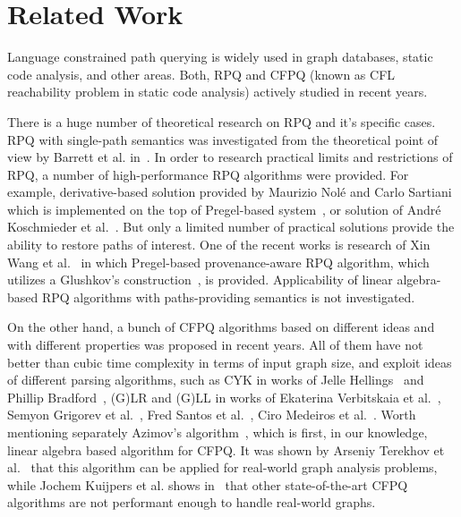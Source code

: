 \section{Related Work}

Language constrained path querying is widely used in graph databases, static code analysis, and other areas.
Both, RPQ and CFPQ (known as CFL reachability problem in static code analysis) actively studied in recent years.

There is a huge number of theoretical research on RPQ and it's specific cases.
RPQ with single-path semantics was investigated from the theoretical point of view by Barrett et al. in~\cite{barrett2000formal}.
In order to research practical limits and restrictions of RPQ, a number of high-performance RPQ algorithms were provided.
For example, derivative-based solution provided by Maurizio Nol\'{e} and Carlo Sartiani which is implemented on the top of Pregel-based system~\cite{10.1145/2949689.2949711}, or solution of Andr\'{e} Koschmieder et al.~\cite{10.1007/978-3-642-31235-9_12}.
But only a limited number of practical solutions provide the ability to restore paths of interest. 
One of the recent works is research of Xin Wang et al.~\cite{Wang2019} in which Pregel-based provenance-aware RPQ algorithm, which utilizes a Glushkov's construction~\cite{Glushkov1961}, is provided.
Applicability of linear algebra-based RPQ algorithms with paths-providing semantics is not investigated.

On the other hand, a bunch of CFPQ algorithms based on different ideas and with different properties was proposed in recent years. 
All of them have not better than cubic time complexity in terms of input graph size, and exploit ideas of different parsing algorithms, such as CYK in works of Jelle Hellings~\cite{hellingsRelational} and Phillip Bradford~\cite{8249039}, (G)LR and (G)LL in works of Ekaterina Verbitskaia et al.~\cite{10.1007/978-3-319-41579-6_22}, Semyon Grigorev et al.~\cite{Grigorev:2017:CPQ:3166094.3166104}, Fred Santos et al.~\cite{10.1007/978-3-319-91662-0_17}, Ciro Medeiros et al.~\cite{Medeiros:2018:EEC:3167132.3167265}.
Worth mentioning separately Azimov's algorithm~\cite{Azimov:2018:CPQ:3210259.3210264}, which is first, in our knowledge, linear algebra based algorithm for CFPQ. 
It was shown by Arseniy Terekhov et al.~\cite{10.1145/3398682.3399163} that this algorithm can be applied for real-world graph analysis problems, while Jochem Kuijpers et al. shows in~\cite{Kuijpers:2019:ESC:3335783.3335791} that other state-of-the-art CFPQ algorithms are not performant enough to handle real-world graphs.

